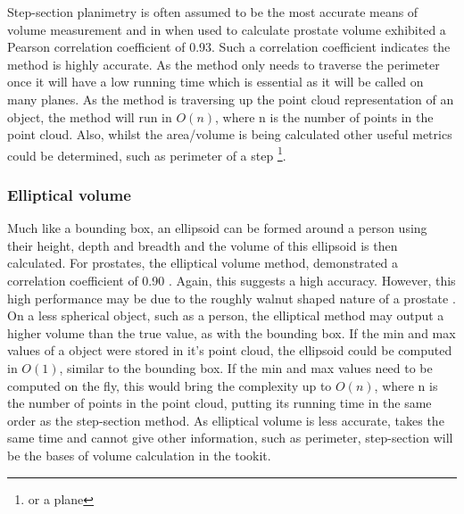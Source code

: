 Step-section planimetry is often assumed to be the most accurate means of volume measurement and in when used to calculate prostate volume \cite{K1991} exhibited a Pearson correlation coefficient of 0.93. 
Such a correlation coefficient indicates the method is highly accurate.
As the method only needs to traverse the perimeter once it will have a low running time which is essential as it will be called on many planes. As the method is traversing up the point cloud representation of an object, the method will run in $O(n)$, where n is the number of points in the point cloud. Also, whilst the area/volume is being calculated other useful metrics could be determined, such as perimeter of a step \footnote{or a plane}.\\

\subsubsection{Elliptical volume}
Much like a bounding box, an ellipsoid can be formed around a person using their height, depth and breadth and the volume of this ellipsoid is then calculated. For prostates, the elliptical volume method, demonstrated a correlation coefficient of 0.90 \cite{K1991}. Again, this suggests a high accuracy. However, this high performance may be due to the roughly walnut shaped nature of a prostate . On a less spherical object, such as a person, the elliptical method may output a higher volume than the true value, as with the bounding box. If the min and max values of a object were stored in it's point cloud, the ellipsoid could be computed in $O(1)$, similar to the bounding box. If the min and max values need to be computed on the fly, this would bring the complexity up to $O(n)$, where n is the number of points in the point cloud, putting its running time in the same order as the step-section method. As elliptical volume is less accurate, takes the same time and cannot give other information, such as perimeter, step-section will be the bases of volume calculation in the tookit.